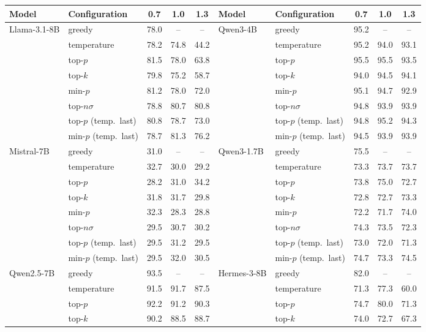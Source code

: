 \begin{tabular}{llccc@{\hspace{14pt}}llccc}
\toprule
Model & Configuration & 0.7 & 1.0 & 1.3 & Model & Configuration & 0.7 & 1.0 & 1.3 \\
\midrule
Llama-3.1-8B & greedy & 78.0 & -- & -- & Qwen3-4B & greedy & 95.2 & -- & -- \\
 & temperature & 78.2 & 74.8 & 44.2 &  & temperature & 95.2 & 94.0 & 93.1 \\
 & top-$p$ & 81.5 & 78.0 & 63.8 &  & top-$p$ & 95.5 & 95.5 & 93.5 \\
 & top-$k$ & 79.8 & 75.2 & 58.7 &  & top-$k$ & 94.0 & 94.5 & 94.1 \\
 & min-$p$ & 81.2 & 78.0 & 72.0 &  & min-$p$ & 95.1 & 94.7 & 92.9 \\
 & top-$n\sigma$ & 78.8 & 80.7 & 80.8 &  & top-$n\sigma$ & 94.8 & 93.9 & 93.9 \\
 & top-$p$ (temp.\ last) & 80.8 & 78.7 & 73.0 &  & top-$p$ (temp.\ last) & 94.8 & 95.2 & 94.3 \\
 & min-$p$ (temp.\ last) & 78.7 & 81.3 & 76.2 &  & min-$p$ (temp.\ last) & 94.5 & 93.9 & 93.9 \\
\midrule
Mistral-7B & greedy & 31.0 & -- & -- & Qwen3-1.7B & greedy & 75.5 & -- & -- \\
 & temperature & 32.7 & 30.0 & 29.2 &  & temperature & 73.3 & 73.7 & 73.7 \\
 & top-$p$ & 28.2 & 31.0 & 34.2 &  & top-$p$ & 73.8 & 75.0 & 72.7 \\
 & top-$k$ & 31.8 & 31.7 & 29.8 &  & top-$k$ & 72.8 & 72.7 & 73.3 \\
 & min-$p$ & 32.3 & 28.3 & 28.8 &  & min-$p$ & 72.2 & 71.7 & 74.0 \\
 & top-$n\sigma$ & 29.5 & 30.7 & 30.2 &  & top-$n\sigma$ & 74.3 & 73.5 & 72.3 \\
 & top-$p$ (temp.\ last) & 29.5 & 31.2 & 29.5 &  & top-$p$ (temp.\ last) & 73.0 & 72.0 & 71.3 \\
 & min-$p$ (temp.\ last) & 29.5 & 32.0 & 30.5 &  & min-$p$ (temp.\ last) & 74.7 & 73.3 & 74.5 \\
\midrule
Qwen2.5-7B & greedy & 93.5 & -- & -- & Hermes-3-8B & greedy & 82.0 & -- & -- \\
 & temperature & 91.5 & 91.7 & 87.5 &  & temperature & 71.3 & 77.3 & 60.0 \\
 & top-$p$ & 92.2 & 91.2 & 90.3 &  & top-$p$ & 74.7 & 80.0 & 71.3 \\
 & top-$k$ & 90.2 & 88.5 & 88.7 &  & top-$k$ & 74.0 & 72.7 & 67.3 \\

\end{tabular}
